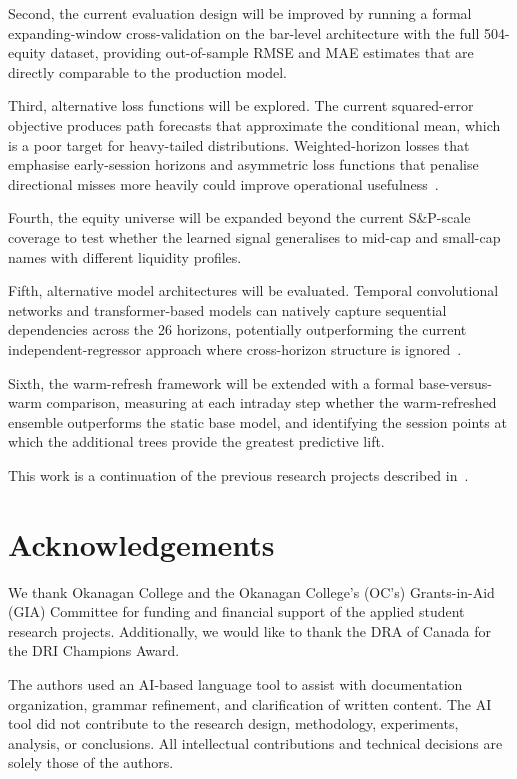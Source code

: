 \documentclass[conference]{IEEEtran}
\begin{document}
Second, the current evaluation design will be improved by running a formal expanding-window cross-validation on the bar-level architecture with the full 504-equity dataset, providing out-of-sample RMSE and MAE estimates that are directly comparable to the production model.

Third, alternative loss functions will be explored. The current squared-error objective produces path forecasts that approximate the conditional mean, which is a poor target for heavy-tailed distributions. Weighted-horizon losses that emphasise early-session horizons and asymmetric loss functions that penalise directional misses more heavily could improve operational usefulness~\cite{tsay2010financial}.

Fourth, the equity universe will be expanded beyond the current S\&P-scale coverage to test whether the learned signal generalises to mid-cap and small-cap names with different liquidity profiles.

Fifth, alternative model architectures will be evaluated. Temporal convolutional networks and transformer-based models can natively capture sequential dependencies across the 26 horizons, potentially outperforming the current independent-regressor approach where cross-horizon structure is ignored~\cite{lim2021time, fischer2018deep}.

Sixth, the warm-refresh framework will be extended with a formal base-versus-warm comparison, measuring at each intraday step whether the warm-refreshed ensemble outperforms the static base model, and identifying the session points at which the additional trees provide the greatest predictive lift.

This work is a continuation of the previous research projects described in~\cite{Khmelevsky2010Cloud, Khmelevsky2011IntCollab, Khmelvesky2011ResTeaching, Khmelevsky2013Mobile, Khmelevsky2015hybrid, 2015HainsCodeGenUML, Khmelevsky2016TenYears, Khmelevsky2016sport, Khmelevsky2016biometric, Khmelevsky2017Bot, Khmelevsky2017gaming, 2020HainsGamersNetPerf, Khmelevsky2020ML, Wong2021Gamers}.

\section*{Acknowledgements}
We thank Okanagan College and the Okanagan College's (OC's) Grants-in-Aid (GIA) Committee for funding and financial support of the applied student research projects. Additionally, we would like to thank the DRA of Canada for the DRI Champions Award.

The authors used an AI-based language tool to assist with documentation organization, grammar refinement, and clarification of written content. The AI tool did not contribute to the research design, methodology, experiments, analysis, or conclusions. All intellectual contributions and technical decisions are solely those of the authors.

\balance



\end{document}
